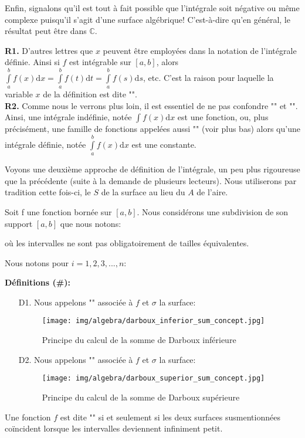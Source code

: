 		Enfin, signalons qu'il est tout à fait possible que l'intégrale soit négative ou même complexe puisqu'il s'agit d'une surface algébrique! C'est-à-dire qu'en général, le résultat peut être dans $\mathbb{C}$.
	\begin{tcolorbox}[title=Remarques,colframe=black,arc=10pt]
	\textbf{R1.} D'autres lettres que $x$  peuvent être employées dans la notation de l'intégrale définie. Ainsi si $f$ est intégrable sur $[a, b]$, alors $\int\limits_a^bf(x)\mathrm{d}x=\int\limits_a^bf(t)\mathrm{d}t=\int\limits_a^bf(s)\mathrm{d}s$, etc. C'est la raison pour laquelle la variable $x$ de la définition est dite "".\\

	\textbf{R2.} Comme nous le verrons plus loin, il est essentiel de ne pas confondre "" et "". Ainsi, une intégrale indéfinie, notée $\int\limits f(x)\mathrm{d}x$ est une fonction, ou, plus précisément, une famille de fonctions appelées aussi "" (voir plus bas) alors qu'une intégrale définie, notée $\int\limits_a^b f(x)\mathrm{d}x$ est une constante. 
	\end{tcolorbox}
	Voyons une deuxième approche de définition de l'intégrale, un peu plus rigoureuse que la précédente (suite à la demande de plusieurs lecteurs). Nous utiliserons par tradition cette fois-ci, le $S$ de la surface au lieu du $A$ de l'aire.
	
	Soit f une fonction bornée sur $[a, b]$. Nous considérons une subdivision de son support $[a, b]$ que nous notons:
	
	où les intervalles ne sont pas obligatoirement de tailles équivalentes.

	Nous notons pour $i=1,2,3,...,n$:	
	
	
	\textbf{Définitions (\#\mydef):}
	\begin{enumerate}
		\item[D1.] Nous appelons "" associée à $f$ et $\sigma$ la surface:
		
		\begin{figure}[H]
			\centering
			\texttt{[image: img/algebra/darboux\_inferior\_sum\_concept.jpg]}
			\caption{Principe du calcul de la somme de Darboux inférieure }
		\end{figure}
		
		\item[D2.] Nous appelons "" associée à $f$ et $\sigma$ la surface:
		
		\begin{figure}[H]
			\centering
			\texttt{[image: img/algebra/darboux\_superior\_sum\_concept.jpg]}
			\caption{Principe du calcul de la somme de Darboux supérieure }
		\end{figure}
	\end{enumerate}
	Une fonction $f$  est dite "" si et seulement si les deux surfaces susmentionnées coïncident lorsque les intervalles deviennent infiniment petit.
	
